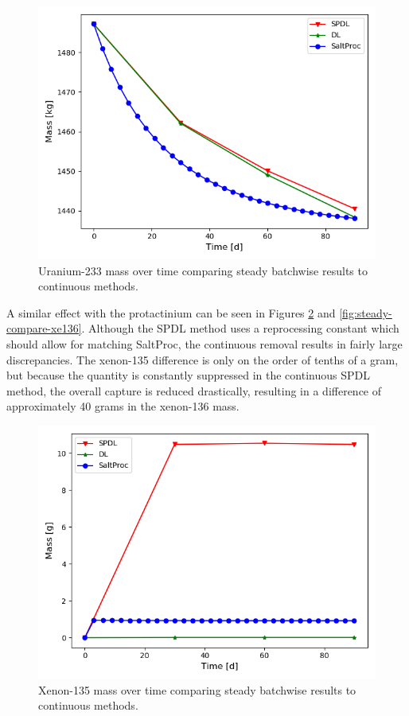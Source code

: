 \begin{figure}[H]
  \centering
  \includegraphics[scale=0.7]{images/soln-1-2-u233.png}
  \caption{Uranium-233 mass over time comparing steady batchwise results to continuous methods.}
   \label{fig:steady-compare-u233}
\end{figure}

A similar effect with the protactinium can be seen in Figures \ref{fig:steady-compare-xe135} and \ref{fig:steady-compare-xe136}. Although the SPDL method uses a reprocessing constant which should allow for matching SaltProc, the continuous removal results in fairly large discrepancies. The xenon-135 difference is only on the order of tenths of a gram, but because the quantity is constantly suppressed in the continuous SPDL method, the overall capture is reduced drastically, resulting in a difference of approximately 40 grams in the xenon-136 mass.

\begin{figure}[H]
  \centering
  \includegraphics[scale=0.7]{images/soln-1-2-xe135.png}
  \caption{Xenon-135 mass over time comparing steady batchwise results to continuous methods.}
   \label{fig:steady-compare-xe135}
\end{figure}

